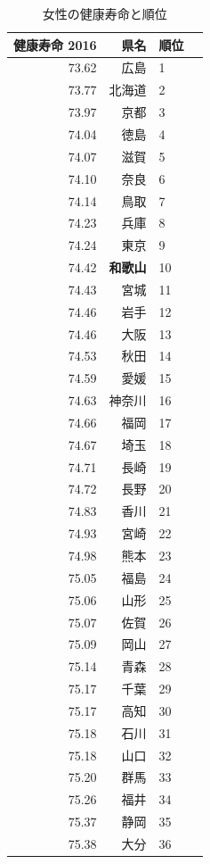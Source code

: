 \begin{table}[ht]
\centering
\footnotesize
\caption{女性の健康寿命と順位}
\begin{tabular}{rrlr}
  \hline
  健康寿命 2016 & 県名 & 順位 \\
  \hline
73.62 & 広島 &   1 \\
 73.77 & 北海道 &   2 \\
 73.97 & 京都 &   3 \\
 74.04 & 徳島 &   4 \\
 74.07 & 滋賀 &   5 \\
 74.10 & 奈良 &   6 \\
 74.14 & 鳥取 &   7 \\
 74.23 & 兵庫 &   8 \\
 74.24 & 東京 &   9 \\
 74.42 & \textbf{和歌山} &  10 \\
 74.43 & 宮城 &  11 \\
 74.46 & 岩手 &  12 \\
 74.46 & 大阪 &  13 \\
 74.53 & 秋田 &  14 \\
 74.59 & 愛媛 &  15 \\
 74.63 & 神奈川 &  16 \\
 74.66 & 福岡 &  17 \\
 74.67 & 埼玉 &  18 \\
 74.71 & 長崎 &  19 \\
 74.72 & 長野 &  20 \\
 74.83 & 香川 &  21 \\
 74.93 & 宮崎 &  22 \\
 74.98 & 熊本 &  23 \\
 75.05 & 福島 &  24 \\
 75.06 & 山形 &  25 \\
 75.07 & 佐賀 &  26 \\
 75.09 & 岡山 &  27 \\
 75.14 & 青森 &  28 \\
 75.17 & 千葉 &  29 \\
 75.17 & 高知 &  30 \\
 75.18 & 石川 &  31 \\
 75.18 & 山口 &  32 \\
 75.20 & 群馬 &  33 \\
 75.26 & 福井 &  34 \\
 75.37 & 静岡 &  35 \\
 75.38 & 大分 &  36 \\

\end{tabular}
\end{table}

